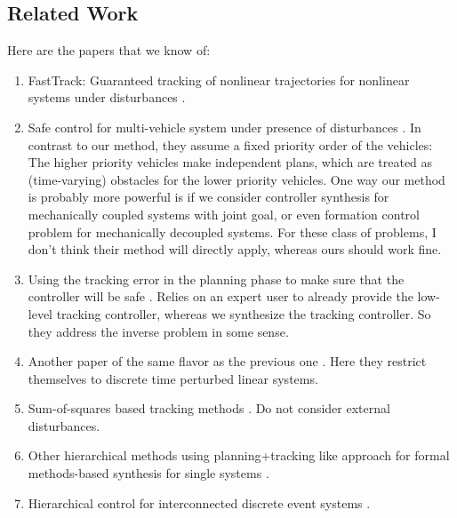 \subsection{Related Work}

Here are the papers that we know of:
\begin{enumerate}
	\item FastTrack: Guaranteed tracking of nonlinear trajectories for nonlinear systems under disturbances \cite{herbert2017fastrack}.
	\item Safe control for multi-vehicle system under presence of disturbances \cite{bansal2017safe}. In contrast to our method, they assume a fixed priority order of the vehicles: The higher priority vehicles make independent plans, which are treated as (time-varying) obstacles for the lower priority vehicles. One way our method is probably more powerful is if we consider controller synthesis for mechanically coupled systems with joint goal, or even formation control problem for mechanically decoupled systems. For these class of problems, I don't think their method will directly apply, whereas ours should work fine.
	\item Using the tracking error in the planning phase to make sure that the controller will be safe \cite{fan2020fast}. Relies on an expert user to already provide the low-level tracking controller, whereas we synthesize the tracking controller. So they address the inverse problem in some sense.
	\item Another paper of the same flavor as the previous one \cite{fan2018controller}. Here they restrict themselves to discrete time perturbed linear systems.
	\item Sum-of-squares based tracking methods \cite{tedrake2010lqr, singh2018robust}. Do not consider external disturbances.
	\item Other hierarchical methods using planning+tracking like approach for formal methods-based synthesis for single systems \cite{wongpiromsarn2012receding, DBLP:journals/tac/MeyerD19, DBLP:journals/corr/abs-1911-09773}.
	\item Hierarchical control for interconnected discrete event systems \cite{wong1996hierarchical,schmidt2008nonblocking}.
\end{enumerate}